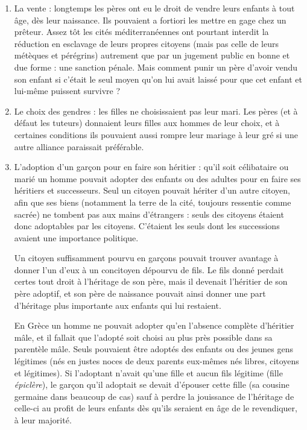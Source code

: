\begin{enumerate}
de comédie du  avant notre ère c'étaient d'abord les filles
qu'on exposait : {\emph{un garçon on l'élève même si on est pauvre, une fille, on l'expose
même si on est riche\footnote{Cité par Jean-Nicolas  et Wieslaw , \emph{la population de l'Antiquité classique}, Que sais-je, PUF, 2000.}%
\footcite[Cité par][]{corvisier2000}%
}} (boutade qui ne nous permet malheureusement pas
de savoir quel était le nombre des abandons effectifs).
\item La vente : longtemps les pères ont eu le droit de vendre leurs
enfants à tout âge, dès leur naissance. Ils pouvaient a fortiori les mettre
en gage chez un prêteur. Assez tôt les cités méditerranéennes ont pourtant
interdit la réduction en esclavage de leurs propres citoyens (mais pas
celle de leurs métèques et pérégrins) autrement que par un jugement public
en bonne et due forme : une sanction pénale. Mais comment punir
un père d'avoir vendu son enfant si c'était le seul moyen qu'on lui avait
laissé pour que cet enfant et lui-même puissent survivre ?
\item Le choix des gendres : les filles ne choisissaient pas leur mari.
Les pères (et à défaut les tuteurs) donnaient leurs filles aux hommes de
leur choix, et à certaines conditions ils pouvaient aussi rompre leur mariage
à leur gré si une autre alliance paraissait préférable.
\item L'adoption d'un garçon pour en faire son héritier : qu'il soit célibataire
ou marié un homme pouvait adopter des enfants ou des adultes
pour en faire ses héritiers et successeurs. Seul un citoyen pouvait hériter
d'un autre citoyen, afin que ses biens (notamment la terre de la cité, toujours
ressentie comme sacrée) ne tombent pas aux mains d'étrangers :
seuls des citoyens étaient donc adoptables par les citoyens. C'étaient les
seuls dont les successions avaient une importance politique.

Un citoyen suffisamment
pourvu en garçons pouvait trouver avantage à donner l'un d'eux à un concitoyen dépourvu
de fils. Le fils donné perdait certes tout droit à l'héritage de son père, mais il devenait
l'héritier de son père adoptif, et son père de naissance
pouvait ainsi donner une part d'héritage plus importante aux enfants qui
lui restaient.

En Grèce un homme ne pouvait adopter qu'en l'absence complète
d'héritier mâle, et il fallait que l'adopté soit choisi au plus près possible
dans sa parentèle mâle. Seuls pouvaient être adoptés des enfants ou des
jeunes gens légitimes (nés en justes noces de deux parents eux-mêmes
nés libres, citoyens et légitimes). Si l'adoptant n'avait qu'une fille et aucun
fils légitime (fille \emph{épiclère}), le garçon qu'il adoptait se devait d'épouser cette
fille (sa cousine germaine dans beaucoup de cas) sauf à perdre la jouissance
de l'héritage de celle-ci au profit de leurs enfants dès qu'ils seraient
en âge de le revendiquer, à leur majorité.


\end{enumerate}
